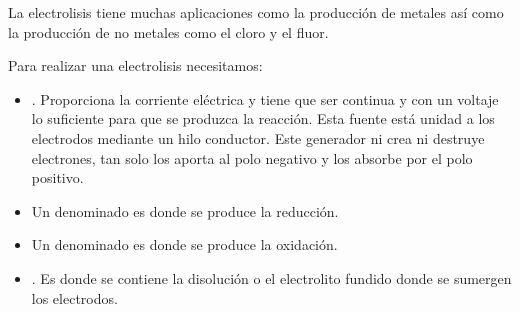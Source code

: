 



    La electrolisis tiene muchas aplicaciones como la producción de metales así como la producción de no metales como el cloro y el fluor.

    Para realizar una electrolisis necesitamos:

    \begin{itemize}
        [label={\color{myOrange3} \(\blacksquare\)}]
        \item {}.
        Proporciona la corriente eléctrica y tiene que ser continua y con un voltaje lo suficiente para que se produzca la reacción.
        Esta fuente está unidad a los electrodos mediante un hilo conductor.
        Este generador ni crea ni destruye electrones, tan solo los aporta al polo negativo y los absorbe por el polo positivo.
        \item Un  denominado  es donde se produce la reducción.
        \item Un  denominado  es donde se produce la oxidación.
        \item {}.
        Es donde se contiene la disolución o el electrolito fundido donde se sumergen los electrodos.
    \end{itemize}

